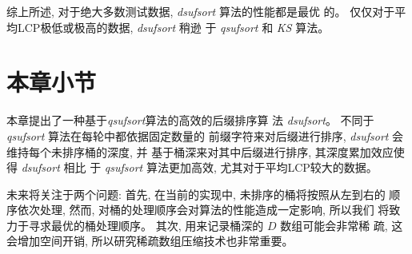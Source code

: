 综上所述, 对于绝大多数测试数据, \emph{dsufsort} 算法的性能都是最优
的。 仅仅对于平均LCP极低或极高的数据, \emph{dsufsort} 稍逊
于 \emph{qsufsort} 和 \emph{KS} 算法。

\section{本章小节}

本章提出了一种基于\emph{qsufsort}算法的高效的后缀排序算
法 \emph{dsufsort}。 不同于 \emph{qsufsort} 算法在每轮中都依据固定数量的
前缀字符来对后缀进行排序, \emph{dsufsort} 会维持每个未排序桶的深度, 并
基于桶深来对其中后缀进行排序, 其深度累加效应使得 \emph{dsufsort} 相比
于 \emph{qsufsort} 算法更加高效, 尤其对于平均LCP较大的数据。

未来将关注于两个问题: 首先, 在当前的实现中, 未排序的桶将按照从左到右的
顺序依次处理, 然而, 对桶的处理顺序会对算法的性能造成一定影响, 所以我们
将致力于寻求最优的桶处理顺序。 其次, 用来记录桶深的 $D$ 数组可能会非常稀
疏, 这会增加空间开销, 所以研究稀疏数组压缩技术也非常重要。
